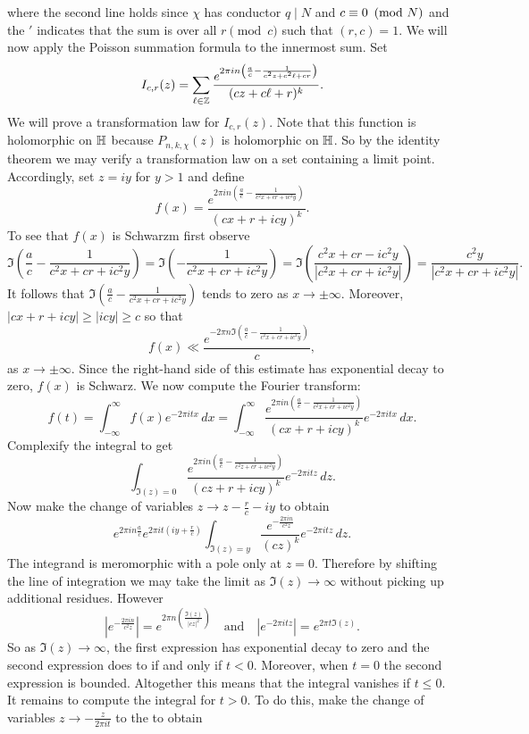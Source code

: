       where the second line holds since $\chi$ has conductor $q \mid N$ and $c \equiv 0 \ \left(\text{mod }N\right)$ and the $'$ indicates that the sum is over all $r \pmod{c}$ such that $(r,c) = 1$. We will now apply the Poisson summation formula to the innermost sum. Set
      \[
        I_{c,r}(z) = \sum_{\ell \in \mathbb{Z}}\frac{e^{2\pi in\left(\frac{a}{c}-\frac{1}{c^{2}z+c^{2}\ell+cr}\right)}}{(cz+c\ell+r)^{k}}.
      \]
      We will prove a transformation law for $I_{c,r}(z)$. Note that this function is holomorphic on $\mathbb{H}$ because $P_{n,k,\chi}(z)$ is holomorphic on $\mathbb{H}$. So by the identity theorem we may verify a transformation law on a set containing a limit point. Accordingly, set $z = iy$ for $y > 1$ and define
      \[
        f(x) = \frac{e^{2\pi in\left(\frac{a}{c}-\frac{1}{c^{2}x+cr+ic^{2}y}\right)}}{(cx+r+icy)^{k}}.
      \]
      To see that $f(x)$ is Schwarzm first observe
      \[
        \Im\left(\frac{a}{c}-\frac{1}{c^{2}x+cr+ic^{2}y}\right) = \Im\left(-\frac{1}{c^{2}x+cr+ic^{2}y}\right) = \Im\left(\frac{c^{2}x+cr-ic^{2}y}{|c^{2}x+cr+ic^{2}y|}\right) = \frac{c^{2}y}{|c^{2}x+cr+ic^{2}y|}.
      \]
      It follows that $\Im\left(\frac{a}{c}-\frac{1}{c^{2}x+cr+ic^{2}y}\right)$ tends to zero as $x \to \pm\infty$. Moreover, $|cx+r+icy| \ge |icy| \ge c$ so that
      \[
        f(x) \ll \frac{e^{-2\pi n\Im\left(\frac{a}{c}-\frac{1}{c^{2}x+cr+ic^{2}y}\right)}}{c},
      \]
      as $x \to \pm\infty$. Since the right-hand side of this estimate has exponential decay to zero, $f(x)$ is Schwarz. We now compute the Fourier transform:
      \[
        \hat{f}(t) = \int_{-\infty}^{\infty}f(x)e^{-2\pi itx}\,dx = \int_{-\infty}^{\infty}\frac{e^{2\pi in\left(\frac{a}{c}-\frac{1}{c^{2}x+cr+ic^{2}y}\right)}}{(cx+r+icy)^{k}}e^{-2\pi itx}\,dx.
      \]
      Complexify the integral to get
      \[
        \int_{\Im(z) = 0}\frac{e^{2\pi in\left(\frac{a}{c}-\frac{1}{c^{2}z+cr+ic^{2}y}\right)}}{(cz+r+icy)^{k}}e^{-2\pi itz}\,dz.
      \]
      Now make the change of variables $z \to z-\frac{r}{c}-iy$ to obtain
      \[
        e^{2\pi in\frac{a}{c}}e^{2\pi it\left(iy+\frac{r}{c}\right)}\int_{\Im(z) = y}\frac{e^{-\frac{2\pi in}{c^{2}z}}}{(cz)^{k}}e^{-2\pi itz}\,dz.
      \]
      The integrand is meromorphic with a pole only at $z = 0$. Therefore by shifting the line of integration we may take the limit as $\Im(z) \to \infty$ without picking up additional residues. However
      \[
        \left|e^{-\frac{2\pi in}{c^{2}z}}\right| = e^{2\pi n\left(\frac{\Im(z)}{|cz|^{2}}\right)} \quad \text{and} \quad \left|e^{-2\pi itz}\right| = e^{2\pi t\Im(z)}.
      \]
      So as $\Im(z) \to \infty$, the first expression has exponential decay to zero and the second expression does to if and only if $t < 0$. Moreover, when $t = 0$ the second expression is bounded. Altogether this means that the integral vanishes if $t \le 0$. It remains to compute the integral for $t > 0$. To do this, make the change of variables $z \to - \frac{z}{2\pi it}$ to the to obtain

